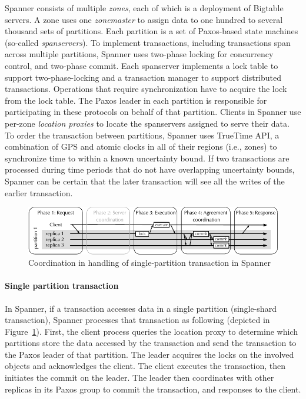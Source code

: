 Spanner consists of multiple \emph{zones}, each of which is a deployment of
Bigtable servers. A zone uses one \emph{zonemaster} to assign data to one
hundred to several thousand sets of partitions. Each partition is a set of
Paxos-based state machines (so-called \emph{spanservers}).  To implement
transactions, including transactions span across multiple partitions, Spanner
uses two-phase locking for concurrency control, and two-phase commit. Each
spanserver implements a lock table to support two-phase-locking and a
transaction manager to support distributed transactions. Operations that
require synchronization have to acquire the lock from the lock table. The Paxos
leader in each partition is responsible for participating in these protocols on
behalf of that partition. Clients in Spanner use per-zone \emph{location
proxies} to locate the spanservers assigned to serve their data. To order the
transaction between partitions, Spanner uses TrueTime API, a combination of GPS
and atomic clocks in all of their regions (i.e., zones) to synchronize time to
within a known uncertainty bound. If two transactions are processed during time
periods that do not have overlapping uncertainty bounds, Spanner can be certain
that the later transaction will see all the writes of the earlier transaction.

\begin{figure}
  \begin{minipage}[b]{1.0\linewidth}
  \centering
        \includegraphics[width=1\linewidth]{figures/spanner-single-partition}
  \end{minipage}
  \caption{Coordination in handling of single-partition transaction in Spanner}
  \label{fig:spanner-single-partition}
\end{figure}

\paragraph{Single partition transaction} In Spanner, if a transaction accesses
data in a single partition (single-shard transaction), Spanner processes that
transaction as following (depicted in
Figure~\ref{fig:spanner-single-partition}). First, the client process queries
the location proxy to determine which partitions store the data accessed by the
transaction and send the transaction to the Paxos leader of that partition. The
leader acquires the locks on the involved objects and acknowledges the client.
The client executes the transaction, then initiates the commit on the leader. The
leader then coordinates with other replicas in its Paxos group to commit the
transaction, and responses to the client.

